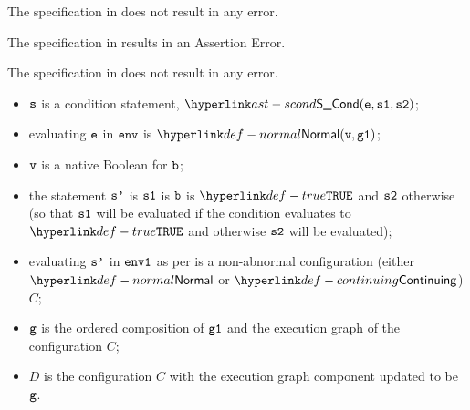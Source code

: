 The specification in 
does not result in any error.

The specification in 
results in an Assertion Error.

The specification in  does not result in any error.

\ProseParagraph
\AllApply
\begin{itemize}
\item $\vs$ is a condition statement, $\SCond(\ve, \vsone, \vstwo)$;
\item evaluating $\ve$ in $\env$ is $\Normal(\vv, \vgone)$\ProseOrAbnormal;
\item $\vv$ is a native Boolean for $\vb$;
\item the statement $\vsp$ is $\vsone$ is $\vb$ is $\True$ and $\vstwo$ otherwise
(so that $\vsone$ will be evaluated if the condition evaluates to $\True$ and otherwise
$\vstwo$ will be evaluated);
\item evaluating $\vsp$ in $\envone$ as per  is a non-abnormal configuration
      (either $\Normal$ or $\Continuing$) $C$\ProseOrAbnormal;
\item $\vg$ is the ordered composition of $\vgone$ and the execution graph of the configuration $C$;
\item $D$ is the configuration $C$ with the execution graph component updated to be $\vg$.
\end{itemize}

\FormallyParagraph
\begin{mathpar}
\end{mathpar}

